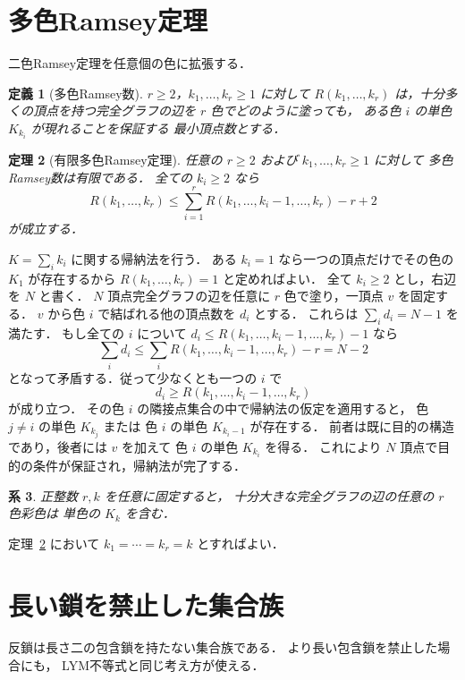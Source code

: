\documentclass[a5paper,10pt,onecolumn]{jsarticle}
\makeatletter
\theoremstyle{mathnotetheorem}
\newtheorem{theorem}{定理}[section]
\newtheorem{definition}[theorem]{定義}
\newtheorem{corollary}[theorem]{系}
\renewcommand{\proofname}{証明}
\renewenvironment{proof}[1][\proofname]{%
  \par\pushQED{\qed}\normalfont\topsep4\p@\@plus2\p@\relax
  \trivlist\item[\hskip\labelsep\bfseries #1]\ignorespaces
}{\popQED\endtrivlist\@endpefalse}
\makeatother
\begin{document}
\section{多色Ramsey定理}
二色Ramsey定理を任意個の色に拡張する．

\begin{definition}[多色Ramsey数]
$r\ge2$，$k_1,\ldots,k_r\ge1$ に対して
$R(k_1,\ldots,k_r)$ は，十分多くの頂点を持つ完全グラフの辺を
$r$ 色でどのように塗っても，
ある色 $i$ の単色 $K_{k_i}$ が現れることを保証する
最小頂点数とする．
\end{definition}

\begin{theorem}[有限多色Ramsey定理]\label{thm:multicolorramsey}
任意の $r\ge2$ および $k_1,\ldots,k_r\ge1$ に対して
多色Ramsey数は有限である．
全ての $k_i\ge2$ なら
\begin{equation}\label{eq:multirrec}
 R(k_1,\ldots,k_r)
 \le\sum_{i=1}^r
 R(k_1,\ldots,k_i-1,\ldots,k_r)-r+2
\end{equation}
が成立する．
\end{theorem}
\begin{proof}
$K=\sum_i k_i$ に関する帰納法を行う．
ある $k_i=1$ なら一つの頂点だけでその色の $K_1$ が存在するから
$R(k_1,\ldots,k_r)=1$ と定めればよい．
全て $k_i\ge2$ とし，右辺を $N$ と書く．
$N$ 頂点完全グラフの辺を任意に $r$ 色で塗り，一頂点 $v$ を固定する．
$v$ から色 $i$ で結ばれる他の頂点数を $d_i$ とする．
これらは $\sum_i d_i=N-1$ を満たす．
もし全ての $i$ について
$d_i\le R(k_1,\ldots,k_i-1,\ldots,k_r)-1$
なら
\[
 \sum_i d_i\le\sum_i R(k_1,\ldots,k_i-1,\ldots,k_r)-r
 =N-2
\]
となって矛盾する．従って少なくとも一つの $i$ で
\[
 d_i\ge R(k_1,\ldots,k_i-1,\ldots,k_r)
\]
が成り立つ．
その色 $i$ の隣接点集合の中で帰納法の仮定を適用すると，
色 $j\ne i$ の単色 $K_{k_j}$ または
色 $i$ の単色 $K_{k_i-1}$ が存在する．
前者は既に目的の構造であり，後者には $v$ を加えて
色 $i$ の単色 $K_{k_i}$ を得る．
これにより $N$ 頂点で目的の条件が保証され，帰納法が完了する．
\end{proof}

\begin{corollary}
正整数 $r,k$ を任意に固定すると，
十分大きな完全グラフの辺の任意の $r$ 色彩色は
単色の $K_k$ を含む．
\end{corollary}
\begin{proof}
定理~\ref{thm:multicolorramsey} において
$k_1=\cdots=k_r=k$ とすればよい．
\end{proof}

\section{長い鎖を禁止した集合族}
反鎖は長さ二の包含鎖を持たない集合族である．
より長い包含鎖を禁止した場合にも，
LYM不等式と同じ考え方が使える．
\end{document}
